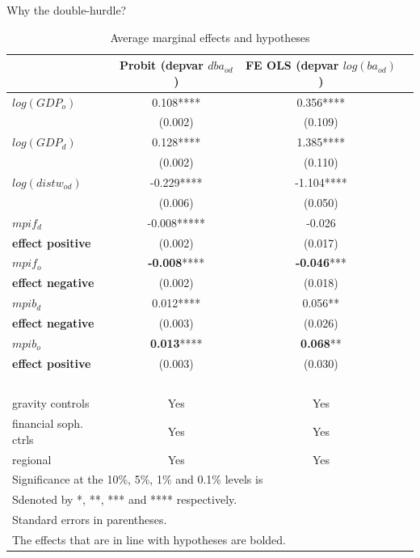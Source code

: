 \documentclass{beamer}
\begin{document}
\begin{frame}{Why the double-hurdle?} 
\begin{table}[!h]
\tiny
\centering
\begin{tabular}{ l | c  c  c }
&Probit (depvar $dba_{od}$) &FE OLS (depvar $log(ba_{od})$) \\
\hline
$log(GDP_{o})$&0.108****&0.356****&\\
&(0.002)&(0.109)&\\
$log(GDP_{d})$&0.128****&1.385****&\\
&(0.002)&(0.110)&\\
$log(distw_{od})$&-0.229****&-1.104****&\\
&(0.006)&(0.050)&\\
$mpif_{d}$&-0.008*****&-0.026&\\
\textbf{effect positive} &(0.002)&(0.017)&\\
$mpif_{o}$&\textbf{-0.008}****&\textbf{-0.046}***&\\
\textbf{effect negative} &(0.002)&(0.018)&\\
$mpib_{d}$&0.012****&0.056**&\\
\textbf{effect negative} &(0.003)&(0.026)&\\
$mpib_{o}$&\textbf{0.013}****&\textbf{0.068}**&\\
\textbf{effect positive} &(0.003)&(0.030)&\\
$$&&\\
gravity controls &Yes&Yes \\ 
financial soph. ctrls &Yes&Yes \\
regional &Yes&Yes \\
\hline
\multicolumn{3}{l}{\tiny Significance at the 10\%, 5\%, 1\% and 0.1\% levels is }\\
\multicolumn{3}{l}{\tiny Sdenoted by *, **, *** and **** respectively.}\\
\multicolumn{3}{l}{\tiny Standard errors in parentheses.}\\
\multicolumn{3}{l}{\tiny The effects that are in line with hypotheses are bolded.}\\
\end{tabular}
\caption{Average marginal effects and hypotheses}
\label{tab:methods}
\end{table}
\end{frame}
\end{document}

